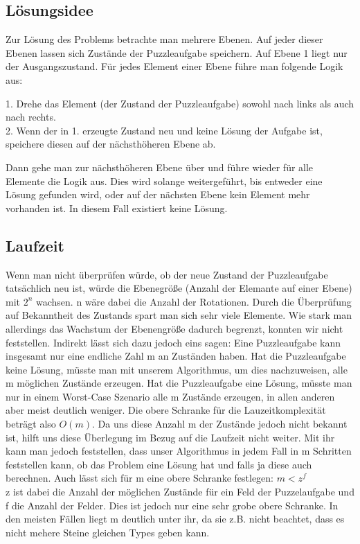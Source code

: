 \subsection {Lösungsidee}
	Zur Lösung des Problems betrachte man mehrere Ebenen. Auf jeder dieser Ebenen lassen sich Zustände der Puzzleaufgabe speichern. 
	Auf Ebene 1 liegt nur der Ausgangszustand. Für jedes Element einer Ebene führe man folgende Logik aus:

	1. Drehe das Element (der Zustand der Puzzleaufgabe) sowohl nach links als auch nach rechts.\\
	2. Wenn der in 1. erzeugte Zustand neu und keine Lösung der Aufgabe ist, speichere diesen auf der nächsthöheren Ebene ab.

	Dann gehe man zur nächsthöheren Ebene über und führe wieder für alle Elemente die Logik aus.
	Dies wird solange weitergeführt, bis entweder eine Lösung gefunden wird, oder auf der nächsten Ebene kein Element mehr vorhanden ist.
	In diesem Fall existiert keine Lösung.

	
\subsection{Laufzeit}
	Wenn man nicht überprüfen würde, ob der neue Zustand der Puzzleaufgabe tatsächlich neu ist, würde die Ebenegröße (Anzahl der Elemante auf einer Ebene) mit \(2^n\) wachsen.  
	n wäre dabei die Anzahl der Rotationen. Durch die Überprüfung auf Bekanntheit des Zustands spart man sich sehr viele Elemente. 
	Wie stark man allerdings das Wachstum der Ebenengröße dadurch begrenzt, konnten wir nicht feststellen. Indirekt lässt sich dazu jedoch eins sagen: 
	Eine Puzzleaufgabe kann insgesamt nur eine endliche Zahl m an Zuständen haben. 
	Hat die Puzzleaufgabe keine Lösung, müsste man mit unserem Algorithmus, um dies nachzuweisen, alle m möglichen Zustände erzeugen.
	Hat die Puzzleaufgabe eine Lösung, müsste man nur in einem Worst-Case Szenario alle m Zustände erzeugen, in allen anderen aber meist deutlich weniger.
	Die obere Schranke für die Lauzeitkomplexität beträgt also \(O(m)\). Da uns diese Anzahl m der Zustände jedoch nicht bekannt ist, hilft uns diese Überlegung im Bezug auf die Laufzeit nicht weiter. 
	Mit ihr kann man jedoch feststellen, dass unser Algorithmus in jedem Fall in m Schritten feststellen kann, ob das Problem eine Lösung hat und falls ja diese auch berechnen. 
	Auch lässt sich für m eine obere Schranke festlegen: \(m < z^f\) \\ z ist dabei die Anzahl der möglichen Zustände für ein Feld der Puzzelaufgabe und f die Anzahl der Felder.
	Dies ist jedoch nur eine sehr grobe obere Schranke. In den meisten Fällen liegt m deutlich unter ihr, da sie z.B. nicht beachtet, dass es nicht mehere Steine gleichen Types geben kann.
